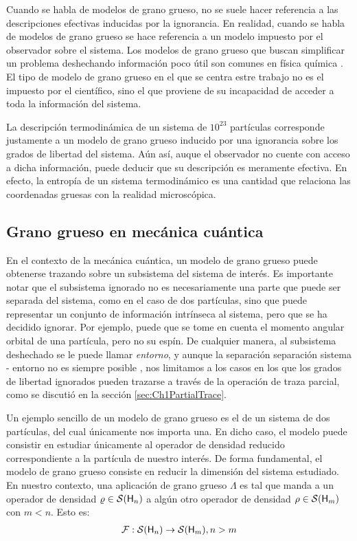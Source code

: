 Cuando se habla de modelos de grano grueso, no se suele hacer referencia a las descripciones efectivas inducidas por la ignorancia. En realidad, cuando se habla de modelos de grano grueso se hace referencia a un modelo impuesto por el observador sobre el sistema. Los modelos de grano grueso que buscan simplificar un problema deshechando información poco útil son comunes en física química \cite{PhysChemI,PhysChemII,PhysChemIII}. El tipo de modelo de grano grueso en el que se centra estre trabajo no es el impuesto por el científico, sino el que proviene de su incapacidad de acceder a toda la información del sistema.

La descripción termodinámica de un sistema de $10^{23}$ partículas corresponde justamente a un modelo de grano grueso inducido por una ignorancia sobre los grados de libertad del sistema. Aún así, auque el observador no cuente con acceso a dicha información, puede deducir que su descripción es meramente efectiva. En efecto, la entropía de un sistema termodinámico es una cantidad que relaciona las coordenadas gruesas con la realidad microscópica.

\subsection{Grano grueso en mecánica cuántica}

En el contexto de la mecánica cuántica, un modelo de grano grueso puede obtenerse trazando sobre un subsistema del sistema de interés. Es importante notar que el subsistema ignorado no es necesariamente una parte que puede ser separada del sistema, como en el caso de dos partículas, sino que puede representar un conjunto de información intrínseca al sistema, pero que se ha decidido ignorar. Por ejemplo, puede que se tome en cuenta el momento angular orbital de una partícula, pero no su espín. De cualquier manera, al subsistema deshechado se le puede llamar \textit{entorno}, y aunque la separación separación sistema - entorno no es siempre posible \cite{Macro-To-Micro}, nos limitamos a los casos en los que los grados de libertad ignorados pueden trazarse a través de la operación de traza parcial, como se discutió en la sección \ref{sec:Ch1PartialTrace}.

Un ejemplo sencillo de un modelo de grano grueso es el de un sistema de dos partículas, del cual únicamente nos importa una. En dicho caso, el modelo puede consistir en estudiar únicamente al operador de densidad reducido correspondiente a la partícula de nuestro interés. De forma fundamental, el modelo de grano grueso consiste en reducir la dimensión del sistema estudiado. En nuestro contexto, una aplicación de grano grueso $\Lambda$ es tal que manda a un operador de densidad $\varrho\in\mathcal{S}({\sf H}_{n})$ a algún otro operador de densidad $\rho\in\mathcal{S}({\sf H}_{m})$ con $m<n$. Esto es:
\begin{align*}
    \mathcal{F}:\mathcal{S}({\sf H}_{n})\to \mathcal{S}({\sf H}_{m}), n>m
\end{align*}